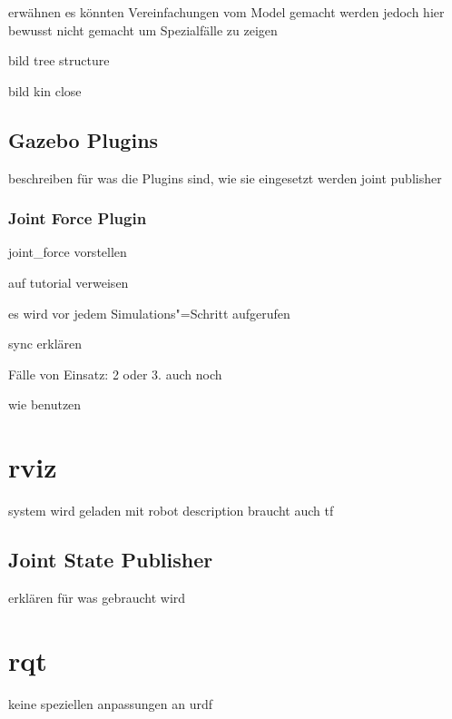 erwähnen es könnten Vereinfachungen vom Model gemacht werden
jedoch hier bewusst nicht gemacht um Spezialfälle zu zeigen

bild tree structure

bild kin close


\subsection{Gazebo Plugins}
beschreiben für was die Plugins sind, wie sie eingesetzt werden
joint publisher


\subsubsection{Joint Force Plugin}
joint_force vorstellen

auf tutorial verweisen

es wird vor jedem Simulations"=Schritt aufgerufen

sync erklären

Fälle von Einsatz: 2 oder 3. auch noch

wie benutzen 


\section{rviz}
system wird geladen mit robot description
braucht auch tf

\subsection{Joint State Publisher}
erklären für was gebraucht wird

\section{rqt}
keine speziellen anpassungen an urdf 



